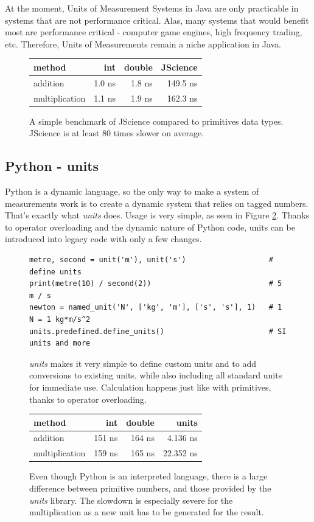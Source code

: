 \documentclass[12pt,oneside,a4paper]{scrbook}
\begin{document}
At the moment, Units of Measurement Systems in Java are only practicable in systems that are not performance critical. Alas, many systems that would benefit most are performance critical - computer game engines, high frequency trading, etc. Therefore, Units of Measurements remain a niche application in Java.

\begin{figure}
\begin{tabular}{lrrr}
method          & int    & double  & JScience \\
\midrule
addition        & 1.0 ns &  1.8 ns    &   149.5 ns \\
multiplication  & 1.1 ns &  1.9 ns    &   162.3 ns
\end{tabular}
\caption{A simple benchmark of JScience compared to primitives data types. JScience is at least 80 times slower on average.}
\label{bench:jscience}
\end{figure}


\subsection{Python - units}

Python is a dynamic language, so the only way to make a system of measurements work is to create a dynamic system that relies on tagged numbers. That's exactly what \emph{units} \citep{Donohue12} does. Usage is very simple, as seen in Figure \ref{code:python_units}. Thanks to operator overloading and the dynamic nature of Python code, units can be introduced into legacy code with only a few changes.

\begin{figure}
\begin{verbatim}
metre, second = unit('m'), unit('s')                   # define units
print(metre(10) / second(2))                           # 5 m / s
newton = named_unit('N', ['kg', 'm'], ['s', 's'], 1)   # 1 N = 1 kg*m/s^2
units.predefined.define_units()                        # SI units and more
\end{verbatim}
\caption{\emph{units} makes it very simple to define custom units and to add conversions to existing units, while also including all standard units for immediate use. Calculation happens just like with primitives, thanks to operator overloading.}
\label{code:python_units}
\end{figure}



\begin{figure}
\begin{tabular}{lrrr}
method          & int    & double  & units \\
\midrule
addition        & 151 ns &  164 ns    &    4.136 ns \\
multiplication  & 159 ns &  165 ns    &   22.352 ns
\end{tabular}
\caption{Even though Python is an interpreted language, there is a large difference between primitive numbers, and those provided by the \emph{units} library. The slowdown is especially severe for the multiplication as a new unit has to be generated for the result.}
\label{bench:python_units}
\end{figure}
\end{document}

